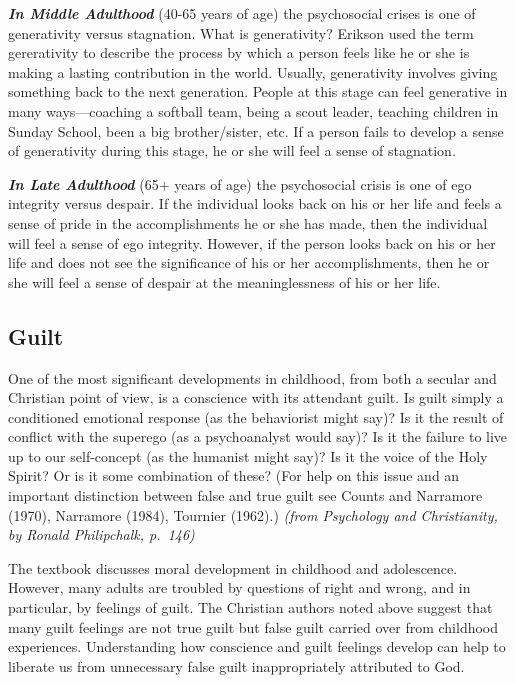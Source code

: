 \documentclass[
]{book}
\begin{document}
\textbf{\emph{In Middle Adulthood}} (40-65 years of age) the psychosocial crises is one of generativity versus stagnation. What is generativity? Erikson used the term gererativity to describe the process by which a person feels like he or she is making a lasting contribution in the world. Usually, generativity involves giving something back to the next generation. People at this stage can feel generative in many ways---coaching a softball team, being a scout leader, teaching children in Sunday School, been a big brother/sister, etc. If a person fails to develop a sense of generativity during this stage, he or she will feel a sense of stagnation.

\textbf{\emph{In Late Adulthood}} (65+ years of age) the psychosocial crisis is one of ego integrity versus despair. If the individual looks back on his or her life and feels a sense of pride in the accomplishments he or she has made, then the individual will feel a sense of ego integrity. However, if the person looks back on his or her life and does not see the significance of his or her accomplishments, then he or she will feel a sense of despair at the meaninglessness of his or her life.

\hypertarget{guilt}{%
\subsection*{Guilt}\label{guilt}}

One of the most significant developments in childhood, from both a secular and Christian point of view, is a conscience with its attendant guilt. Is guilt simply a conditioned emotional response (as the behaviorist might say)? Is it the result of conflict with the superego (as a psychoanalyst would say)? Is it the failure to live up to our self-concept (as the humanist might say)? Is it the voice of the Holy Spirit? Or is it some combination of these? (For help on this issue and an important distinction between false and true guilt see Counts and Narramore (1970), Narramore (1984), Tournier (1962).) \emph{(from Psychology and Christianity, by Ronald Philipchalk, p.~146)}

The textbook discusses moral development in childhood and adolescence. However, many adults are troubled by questions of right and wrong, and in particular, by feelings of guilt. The Christian authors noted above suggest that many guilt feelings are not true guilt but false guilt carried over from childhood experiences. Understanding how conscience and guilt feelings develop can help to liberate us from unnecessary false guilt inappropriately attributed to God.
\end{document}
